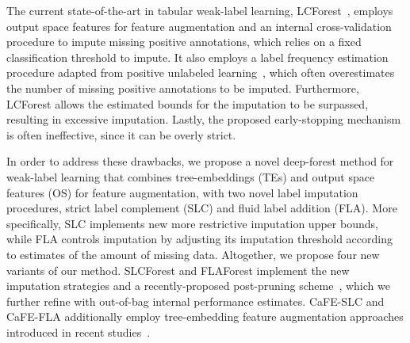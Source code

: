 \documentclass[conference,compsoc]{IEEEtran}
\begin{document}
The current state-of-the-art in tabular weak-label learning, LCForest~\cite{wang2020learning}, employs output space features for feature augmentation and an internal cross-validation procedure to impute missing positive annotations, which relies on a fixed classification threshold to impute. It also employs a label frequency estimation procedure adapted from positive unlabeled learning~\cite{bekker2018estimating}, which often overestimates the number of missing positive annotations to be imputed. Furthermore, LCForest allows the estimated bounds for the imputation to be surpassed, resulting in excessive imputation. Lastly, the proposed early-stopping mechanism is often ineffective, since it can be overly strict.


In order to address these drawbacks, we propose a novel deep-forest method for weak-label learning that combines tree-embeddings (TEs) and output space features (OS) for feature augmentation, with two novel label imputation procedures, strict label complement (SLC) and fluid label addition (FLA). More specifically, SLC implements new more restrictive imputation upper bounds, while FLA controls imputation by adjusting its imputation threshold according to estimates of the amount of missing data.
%
Altogether, we propose four new variants of our method. SLCForest and FLAForest implement the new imputation strategies and a recently-proposed post-pruning scheme~\cite{nakano2022deep}, which we further refine with out-of-bag internal performance estimates. CaFE-SLC and CaFE-FLA additionally employ tree-embedding feature augmentation approaches introduced in recent studies~\cite{nakano2022deep}.
\end{document}
